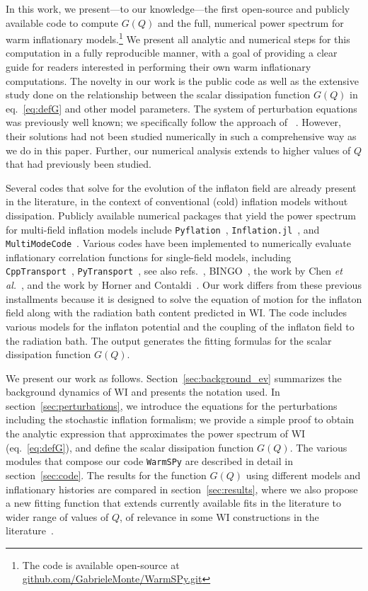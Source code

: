 \documentclass[a4paper,11pt]{article}
\begin{document}
In this work, we present—to our knowledge—the first open-source and publicly available code to compute $G(Q)$ and the full, numerical power spectrum for warm inflationary models.\footnote{The code is available open-source at \href{https://github.com/GabrieleMonte/WarmSPy.git}{github.com/GabrieleMonte/WarmSPy.git}} We present all analytic and numerical steps for this computation in a fully reproducible manner, with a goal of providing a clear guide for readers interested in performing their own warm inflationary computations. The novelty in our work is the public code as well as the extensive study done on the relationship between the scalar dissipation function $G(Q)$ in eq.~\eqref{eq:defG} and other model parameters. The  system of perturbation equations was previously well known; we specifically follow the approach of ~\cite{Ramos:2013nsa}.  
However, their solutions had not been studied numerically in such a comprehensive way as we do in this paper.  Further, our numerical analysis extends to higher values of $Q$ that had previously been studied.

Several codes that solve for the evolution of the inflaton field are already present in the literature, in the context of conventional (cold) inflation models without dissipation. Publicly available numerical packages that yield the power spectrum for  multi-field inflation models include {\tt Pyflation}~\cite{huston:2011vt}, \texttt{Inflation.jl}~\cite{rosati_robert_2020_4708348}, and {\tt MultiModeCode}~\cite{price:2014xpa}. Various codes have been implemented to numerically evaluate inflationary correlation functions for single-field models, including {\tt CppTransport}~\cite{seery:2016lko}, {\tt PyTransport}~\cite{mulryne:2016mzv}, see also refs.~\cite{dias:2016rjq, ronayne:2017qzn}, BINGO~\cite{hazra:2012yn}, the work by Chen {\it et al.}~\cite{chen:2006xjb}, and the work by Horner and Contaldi~\cite{horner:2013sea}. Our work differs from these previous installments because it is designed to solve the equation of motion for the inflaton field along with the radiation bath content predicted in WI. The code includes various models for the inflaton potential and the coupling of the inflaton field to the radiation bath. The output generates the fitting formulas for the scalar dissipation function $G(Q)$.

We present our work as follows. Section~\ref{sec:background_ev} summarizes the background dynamics of WI and presents the notation used. In section~\ref{sec:perturbations}, we introduce the equations for the perturbations including the stochastic inflation formalism; we provide a simple proof to obtain the analytic expression that approximates the power spectrum of WI (eq.~\eqref{eq:defG}), and define the scalar dissipation function $G(Q)$. The various modules that compose our code \texttt{WarmSPy} are described in detail in section~\ref{sec:code}. The results for the function $G(Q)$ using different models and inflationary histories are compared in section~\ref{sec:results}, where we also propose a new fitting function that extends currently available fits in the literature to wider range of values of $Q$, of relevance in some WI constructions in the literature~\cite{Das:2020xmh,Berghaus:2019whh,Bastero-Gil:2019gao}.
\end{document}
